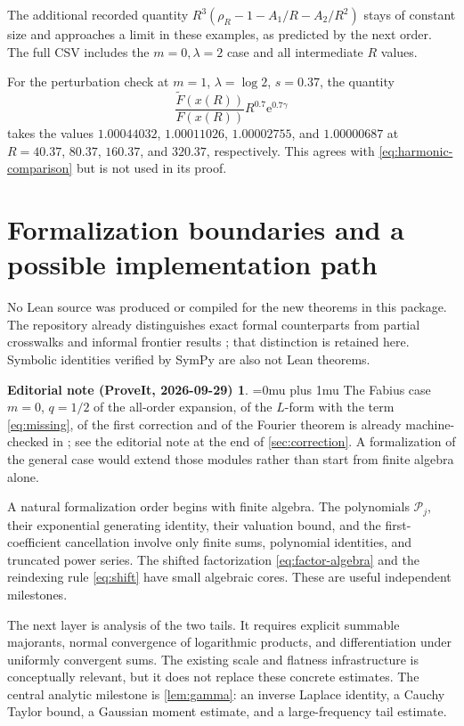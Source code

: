 \documentclass[11pt,a4paper]{article}
\numberwithin{equation}{section}
\theoremstyle{definition}
\newtheorem*{ednoteinner}{Editorial note (ProveIt, 2026-09-29)}
\newenvironment{ednote}{\begin{ednoteinner}\sloppy\Urlmuskip=0mu plus 1mu\relax}{\end{ednoteinner}}
\newcommand{\ee}{\mathrm e}
\newcommand{\calP}{\mathcal P}
\begin{document}
The additional recorded quantity
$R^3(\rho_R-1-A_1/R-A_2/R^2)$ stays of constant size and approaches a limit in these examples, as predicted by the next order. The full CSV includes the $m=0,\lambda=2$ case and all intermediate $R$ values.

For the perturbation check at $m=1$, $\lambda=\log2$, $s=0.37$, the quantity
\[
 \frac{\widetilde F(x(R))}{F(x(R))}R^{0.7}\ee^{0.7\gamma}
\]
takes the values $1.00044032$, $1.00011026$, $1.00002755$, and $1.00000687$ at $R=40.37$, $80.37$, $160.37$, and $320.37$, respectively. This agrees with \eqref{eq:harmonic-comparison} but is not used in its proof.

\section{Formalization boundaries and a possible implementation path}
\label{sec:formalization}

No Lean source was produced or compiled for the new theorems in this package. The repository already distinguishes exact formal counterparts from partial crosswalks and informal frontier results \cite{repotrans}; that distinction is retained here. Symbolic identities verified by SymPy are also not Lean theorems.
\begin{ednote}
The Fabius case $m=0$, $q=1/2$ of the all-order expansion, of the $L$-form with the term \eqref{eq:missing}, of the first correction and of the Fourier theorem is already machine-checked in ; see the editorial note at the end of \cref{sec:correction}. A formalization of the general case would extend those modules rather than start from finite algebra alone.
\end{ednote}

A natural formalization order begins with finite algebra. The polynomials $\calP_j$, their exponential generating identity, their valuation bound, and the first-coefficient cancellation involve only finite sums, polynomial identities, and truncated power series. The shifted factorization \eqref{eq:factor-algebra} and the reindexing rule \eqref{eq:shift} have small algebraic cores. These are useful independent milestones.

The next layer is analysis of the two tails. It requires explicit summable majorants, normal convergence of logarithmic products, and differentiation under uniformly convergent sums. The existing scale and flatness infrastructure is conceptually relevant, but it does not replace these concrete estimates. The central analytic milestone is \cref{lem:gamma}: an inverse Laplace identity, a Cauchy Taylor bound, a Gaussian moment estimate, and a large-frequency tail estimate.
\end{document}
